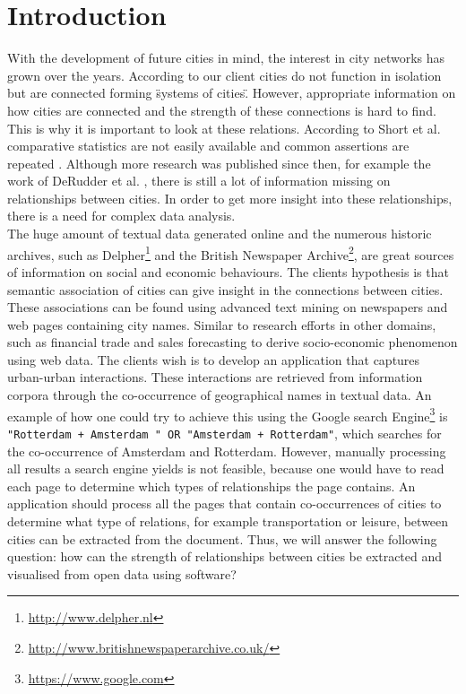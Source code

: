 \section{Introduction}
With the development of future cities in mind, the interest in city networks has grown over the years. According to our client cities do not function in isolation but are connected forming \"systems of cities\". However, appropriate information on how cities are connected and the strength of these connections is hard to find. This is why it is important to look at these relations. According to Short et al. comparative statistics are not easily available and common assertions are repeated \cite{short1996dirty}. Although more research was published since then, for example the work of DeRudder et al. \cite{derudder2005appraisal}, there is still a lot of information missing on relationships between cities.
 In order to get more insight into these relationships, there is a need for complex data analysis. \\

The huge amount of textual data generated online and the numerous historic archives, such as Delpher\footnote{\url{http://www.delpher.nl}} and the British Newspaper Archive\footnote{\url{http://www.britishnewspaperarchive.co.uk/}}, are great sources of information on social and economic behaviours. The clients hypothesis is that semantic association of cities can give insight in the connections between cities. These associations can be found using advanced text mining on newspapers and web pages containing city names. Similar to research efforts in other domains, such as financial trade \cite{preis2013quantifying} and sales forecasting \cite{wu2014future} to derive socio-economic phenomenon using web data. The clients wish is to develop an application that captures urban-urban interactions. These interactions are retrieved from information corpora through the co-occurrence of geographical names in textual data. An example of how one could try to achieve this using the Google search Engine\footnote{\url{https://www.google.com}} is \texttt{"Rotterdam + Amsterdam " OR "Amsterdam + Rotterdam"}, which searches for the co-occurrence of Amsterdam and Rotterdam. However, manually processing all results a search engine yields is not feasible, because one would have to read each page to determine which types of relationships the page contains. An application should process all the pages that contain co-occurrences of cities to determine what type of relations, for example transportation or leisure, between cities can be extracted from the document. Thus, we will answer the following question: 
how can the strength of relationships between cities be extracted and visualised from open data using software? \\

